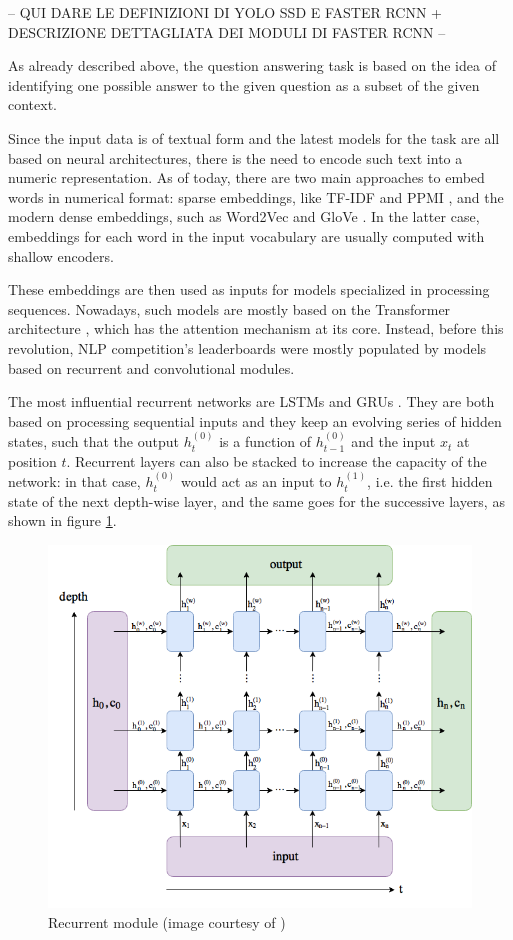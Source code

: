 \documentclass[a4paper,10pt]{report}
\begin{document}
-- QUI DARE LE DEFINIZIONI DI YOLO SSD E FASTER RCNN + DESCRIZIONE DETTAGLIATA DEI MODULI DI FASTER RCNN --

As already described above, the question answering task is based on the idea of identifying one possible answer to the given question as a subset of the given context.

Since the input data is of textual form and the latest models for the task are all based on neural architectures, there is the need to encode such text into a numeric representation. As of today, there are two main approaches to embed words in numerical format: sparse embeddings, like TF-IDF \cite{tf-idf} and PPMI \cite{ppmi}, and the modern dense embeddings, such as Word2Vec \cite{word2vec} and GloVe \cite{glove}. In the latter case, embeddings for each word in the input vocabulary are usually computed with shallow encoders.

These embeddings are then used as inputs for models specialized in processing sequences. Nowadays, such models are mostly based on the Transformer architecture \cite{transformers}, which has the attention mechanism at its core. Instead, before this revolution, NLP competition's leaderboards were mostly populated by models based on recurrent and convolutional modules.

The most influential recurrent networks are LSTMs \cite{lstm} and GRUs \cite{gru}. They are both based on processing sequential inputs and they keep an evolving series of hidden states, such that the output $h_t^{(0)}$ is a function of $h_{t-1}^{(0)}$ and the input $x_t$ at position $t$. Recurrent layers can also be stacked to increase the capacity of the network: in that case, $h_t^{(0)}$ would act as an input to $h_t^{(1)}$, i.e. the first hidden state of the next depth-wise layer, and the same goes for the successive layers, as shown in figure \ref{fig:recurrent}.

\begin{figure}[h]
  \center
  \includegraphics[width=0.65\linewidth]{recurrent}
  \caption{Recurrent module (image courtesy of \cite{recurrent-img})}
  \label{fig:recurrent}
\end{figure}
\end{document}
